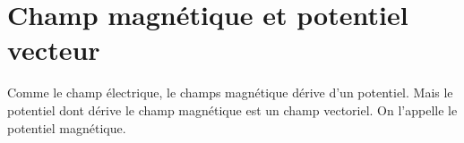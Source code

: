 
\section{Champ magnétique et potentiel vecteur}
%
Comme le champ électrique, le champs magnétique dérive d'un potentiel. Mais le potentiel dont dérive le champ magnétique est un champ vectoriel. On l'appelle le potentiel magnétique.


